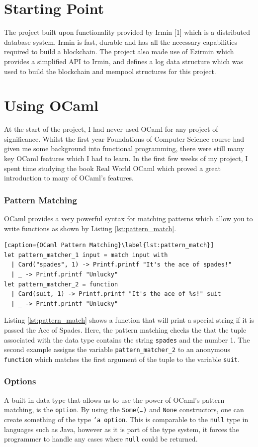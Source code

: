 \documentclass[12pt,a4paper,twoside,openright]{report}
\begin{document}
	\section{Starting Point}
		The project built upon functionality provided by Irmin [1] which is a distributed database system.  Irmin is fast, durable and has all the necessary capabilities required to build a blockchain.
		The project also made use of Ezirmin \cite{Ezirmin} which provides a simplified API to Irmin, and defines a log data structure which was used to build the blockchain and mempool structures for this project.

	\section{Using OCaml}
		At the start of the project, I had never used OCaml for any project of significance. 
		Whilst the first year Foundations of Computer Science course had given me some background into functional programming, there were still many key OCaml features which I had to learn.
		In the first few weeks of my project, I spent time studying the book Real World OCaml \cite{RealWorldOCaml} which proved a great introduction to many of OCaml's features.  

		\subsubsection*{Pattern Matching}
		OCaml provides a very powerful syntax for matching patterns which allow you to write functions as shown by Listing \ref{lst:pattern_match}.
		\begin{lstlisting}[caption={OCaml Pattern Matching}\label{lst:pattern_match}]
let pattern_matcher_1 input = match input with
  | Card("spades", 1) -> Printf.printf "It's the ace of spades!"
  | _ -> Printf.printf "Unlucky"
let pattern_matcher_2 = function
  | Card(suit, 1) -> Printf.printf "It's the ace of %s!" suit
  | _ -> Printf.printf "Unlucky"
		\end{lstlisting}
		Listing \ref{lst:pattern_match} shows a function that will print a special string if it is passed the Ace of Spades. 
		Here, the pattern matching checks the that the tuple associated with the data type contains the string \texttt{spades} and the number 1.
		The second example assigns the variable \texttt{pattern\_matcher\_2} to an anonymous \texttt{function} which matches the first argument of the tuple to the variable \texttt{suit}.
		\subsubsection*{Options}
		A built in data type that allows us to use the power of OCaml's pattern matching, is the \texttt{option}. 
		By using the \texttt{Some(\ldots)} and \texttt{None} constructors, one can create something of the type \texttt{'a option}. 
		This is comparable to the \texttt{null} type in languages such as Java, however as it is part of the type system, it forces the programmer to handle any cases where \texttt{null} could be returned.
\end{document}
